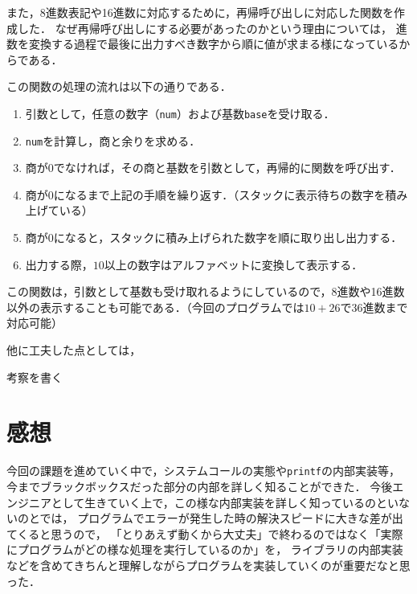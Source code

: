 \documentclass[a4j,11pt]{jarticle}
\begin{document}
また，8進数表記や16進数に対応するために，再帰呼び出しに対応した関数を作成した．
なぜ再帰呼び出しにする必要があったのかという理由については，
進数を変換する過程で最後に出力すべき数字から順に値が求まる様になっているからである．

この関数の処理の流れは以下の通りである．
\begin{enumerate}
      \item 引数として，任意の数字（{\tt num}）および基数{\tt base}を受け取る．
      \item {\tt num}を計算し，商と余りを求める．
      \item 商が$0$でなければ，その商と基数を引数として，再帰的に関数を呼び出す．
      \item 商が$0$になるまで上記の手順を繰り返す．（スタックに表示待ちの数字を積み上げている）
      \item 商が$0$になると，スタックに積み上げられた数字を順に取り出し出力する．
      \item 出力する際，$10$以上の数字はアルファベットに変換して表示する．
\end{enumerate}

この関数は，引数として基数も受け取れるようにしているので，8進数や16進数以外の表示することも可能である．（今回のプログラムでは$10 + 26$で36進数まで対応可能）

他に工夫した点としては，



考察を書く

\section{感想}
今回の課題を進めていく中で，システムコールの実態や{\tt printf}の内部実装等，
今までブラックボックスだった部分の内部を詳しく知ることができた．
今後エンジニアとして生きていく上で，この様な内部実装を詳しく知っているのといないのとでは，
プログラムでエラーが発生した時の解決スピードに大きな差が出てくると思うので，
「とりあえず動くから大丈夫」で終わるのではなく「実際にプログラムがどの様な処理を実行しているのか」を，
ライブラリの内部実装などを含めてきちんと理解しながらプログラムを実装していくのが重要だなと思った．
\end{document}
